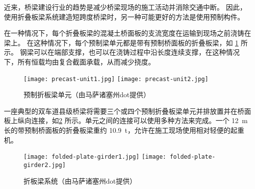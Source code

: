近来，桥梁建设行业的趋势是减少桥梁现场的施工活动并消除交通中断。 因此，使用折叠板梁系统建造短跨度桥梁时，另一种可能更好的方法是使用预制构件。

在一种情况下，每个折叠板梁的混凝土桥面板的支流宽度在运输到现场之前浇铸在梁上。 在这种情况下，每个预制梁单元都是带有预制桥面板的折叠板梁，如 \cref{fig:precast-folded-plate-girder-unit} 所示。 钢梁可以在端部支撑，也可以在浇铸过程中沿长度连续支撑，在这种情况下，所有恒载均由复合截面承载，从而减少挠度。

\begin{figure}
  \texttt{[image: precast-unit1.jpg]}\hfill
  \texttt{[image: precast-unit2.jpg]}
  \caption{预制折板梁单元（由马萨诸塞州\acrlong*{dot}提供）}
  \label{fig:precast-folded-plate-girder-unit}
\end{figure}

一座典型的双车道县级桥梁将需要三个或四个预制折叠板梁单元并排放置并在桥面板上纵向连接，如\cref{fig:folded-plate-girder-system} 所示。单元之间的连接可以使用多种方法来完成。一个 \qty{12}{m} 长的带预制桥面板的折叠板梁重约 \qty{10.9}{\tonne}，允许在施工现场使用相对轻便的起重机。

\begin{figure}
  \texttt{[image: folded-plate-girder1.jpg]}\hfill
  \texttt{[image: folded-plate-girder2.jpg]}
  \caption{折板梁系统（由马萨诸塞州\acrlong*{dot}提供）}
  \label{fig:folded-plate-girder-system}
\end{figure}

